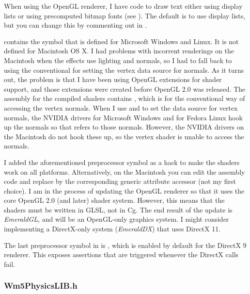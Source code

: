 \documentclass{article}
\begin{document}
When using the OpenGL renderer, I have code to draw text either using
display lists or using precomputed bitmap fonts (see
).  The default is to use display lists,
but you can change this by commenting out 
in .

 contains the symbol
 that is defined for Microsoft
Windows and Linux.  It is not defined for Macintosh OS X.  I had problems
with incorrent renderings on the Macintosh when the effects use lighting
and normals, so I had to fall back to using the conventional
 for setting the vertex data source for normals.
As it turns out, the problem is that I have been using OpenGL extensions
for shader support, and those extensions were created before OpenGL 2.0
was released.  The assembly for the compiled shaders contains
, which is for the conventional way of accessing
the vertex normals.  When I use 
and  to set the data source for vertex
normals, the NVIDIA drivers for Microsoft Windows and for Fedora Linux
hook up the normals so that  refers to those normals.
However, the NVIDIA drivers on the Macintosh do not hook these up, so
the vertex shader is unable to access the normals.

I added the aforementioned preprocessor symbol as a hack to make the shaders
work on all platforms.  Alternatively, on the Macintosh you can edit the
assembly code and replace  by the corresponding
generic attribute accessor (not my first choice).  I am in the process
of updating the OpenGL renderer so that it uses the core OpenGL 2.0 (and
later) shader system.  However, this means that the shaders must be written
in GLSL, not in Cg.  The end result of the update is {\em EmeraldGL}, and
will be an OpenGL-only graphics system.  I might consider implementing
a DirectX-only system ({\em EmeraldDX}) that uses DirectX 11.

The last preprocessor symbol in  is
, which is enabled by default for the DirectX 9
renderer.  This exposes assertions that are triggered whenever the DirectX
calls fail.

\subsubsection{Wm5PhysicsLIB.h}
\end{document}
